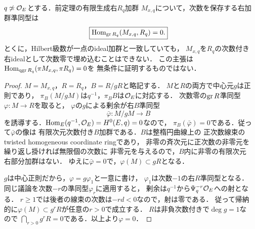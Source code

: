 \begin{proposition}
\label{prop:duval-no-graded-inclusion}
$q\not\simeq\mathcal O_E$とする．前定理の有限生成右$R_q$加群
$M_{x,q}$について，次数を保存する右加群準同型は
\[
 \boxed{\operatorname{Hom}_{\operatorname{gr} R_q}(M_{x,q},R_q)=0.}
\]
とくに，Hilbert級数が一点のideal加群と一致していても，
$M_{x,q}$を$R_q$の次数付き右idealとして次数零で埋め込むことはできない．
この主張は$\operatorname{Hom}_{\operatorname{qgr} R_q}(\pi M_{x,q},\pi R_q)=0$を
無条件に証明するものではない．
\end{proposition}
\begin{proof}
$M=M_{x,q}$，$R=R_q$，$B=R/gR$と略記する．
$M$と$R$の両方で中心元$g$は正則であり，
$\pi_B(M/gM)$は$q^{-1}$，$\pi_B B$は$\mathcal O_E$に対応する．
次数零の$\operatorname{gr} R$準同型$\varphi:M\to R$を取ると，
$\varphi$の$g$による剰余が右$B$準同型
\[
 \bar\varphi:M/gM\longrightarrow B
\]
を誘導する．$\operatorname{Hom}_E(q^{-1},\mathcal O_E)=H^0(E,q)=0$なので，
$\pi_B(\bar\varphi)=0$である．従って$\bar\varphi$の像は
有限次元次数付き$B$加群である．$B$は整楕円曲線上の
正次数線束のtwisted homogeneous coordinate ringであり，
非零の斉次元に正次数の非零元を繰り返し掛ければ無限個の次数に
非零元を与えるので，$B$内に非零の有限次元右部分加群はない．
ゆえに$\bar\varphi=0$で，$\varphi(M)\subset gR$となる．

$g$は中心正則だから，$\varphi=g\varphi_1$と一意に書け，
$\varphi_1$は次数$-1$の右$R$準同型となる．
同じ議論を次数$-r$の準同型$\varphi_r$に適用すると，
剰余は$q^{-1}$から$\Psi_q^{-r}\mathcal O_E$への射となる．
$r\ge1$では後者の線束の次数は$-rd<0$なので，射は零である．
従って帰納的に$\varphi(M)\subset g^rR$が任意の$r>0$で成立する．
$R$は非負次数付きで$\deg g=1$なので
$\bigcap_{r>0}g^rR=0$である．以上より$\varphi=0$．
\end{proof}

